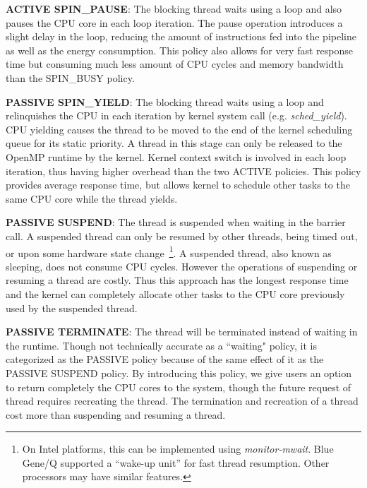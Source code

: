 	{\bf ACTIVE SPIN\_PAUSE}: The blocking thread waits using a loop and also pauses the CPU core in 
	each loop iteration. The pause operation introduces a slight delay in the loop, reducing the amount 
	of instructions fed into the pipeline as well as the energy consumption. This policy also allows 
	for very fast response time but consuming much less amount of CPU cycles 
	and memory bandwidth than the {\sf SPIN\_BUSY} policy.

	{\bf PASSIVE SPIN\_YIELD}:  The blocking thread waits using a loop and 
	relinquishes the CPU in each iteration by kernel system call (e.g. {\em sched\_yield}). CPU yielding causes
	the thread to be moved to the end of the kernel scheduling queue for its static priority. A thread in this 
		stage can only be released to the OpenMP runtime by the kernel. Kernel context switch is involved
		in each loop iteration, thus having higher overhead than the two {\sf ACTIVE} policies. 
		This policy provides average response time, but allows kernel to schedule other tasks to the same
		CPU core while the thread yields. 

	{\bf PASSIVE SUSPEND}: The thread is suspended when waiting in the barrier call. A suspended thread can only
	be resumed by other threads, being timed out, or upon some hardware state change~\footnote{
                    On Intel platforms, this can be implemented using {\em monitor-mwait}.
                    Blue Gene/Q supported a ``wake-up unit'' for fast thread resumption.
                     Other processors may have similar features.}. A suspended thread, also known as sleeping,  
		     does not consume CPU cycles. 
		     However the operations of suspending or resuming a thread are costly. 
		     Thus this approach has the longest response time and 
		     the kernel can completely allocate other tasks to the CPU 
		     core previously used by the suspended thread. %

       {\bf PASSIVE TERMINATE}: The thread will be terminated instead of waiting in the runtime. Though not technically accurate as
       a ``waiting" policy, it is categorized as the {\sf PASSIVE} policy because of the same effect of it as the {\sf PASSIVE SUSPEND} policy. 
       By introducing this policy, 
       we give users an option to return completely the CPU cores to the system, though the future request of thread requires 
       recreating the thread. The termination and recreation of a thread cost more than suspending and resuming a thread.  


